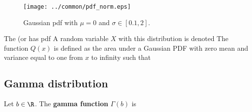 \begin{figure}[ht]
   \begin{center}
   \texttt{[image: ../common/pdf\_norm.eps]} 
   \end{center}
\caption{
  Gaussian pdf with $\mu=0$ and $\sigma\in[0.1,2]$.
  \label{fig:pdf_norm}
  }
\end{figure}

\begin{definition}
The  (or  has pdf
A random variable $X$ with this distribution is denoted
The function $Q(x)$ is defined as the area under a 
Gaussian PDF with zero mean and variance equal to one
from $x$ to infinity such that
\end{definition}

\subsection{Gamma distribution}
\begin{definition}
\label{def:Gamma(b)}
Let $b\in\R$. The {\bf gamma function} $\Gamma(b)$ is
\end{definition}

